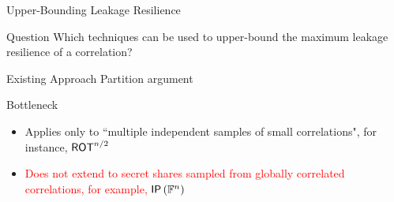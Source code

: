 \begin{frame}{Upper-Bounding Leakage Resilience}

{
	\begin{block}{Question}
		Which techniques can be used to upper-bound the maximum leakage resilience of a correlation?
	\end{block}
}

\pause

{
	\begin{block}{Existing Approach}
		Partition argument
	\end{block}
}

\pause

{
\begin{block}{Bottleneck}
\begin{itemize}
	\item Applies only to ``multiple independent samples of small correlations", for instance, $ \ROT[n/2] $
	\item \textcolor{red}{Does not extend to secret shares sampled from globally correlated correlations, for example, $ \IP[\bbF^n] $}
\end{itemize}
\end{block}
}

\end{frame}

